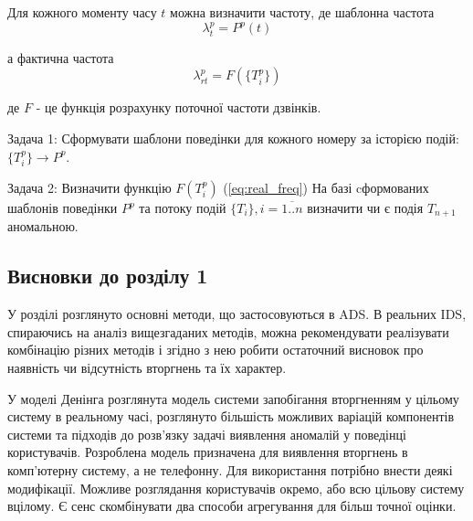   Для кожного моменту часу $t$ можна визначити частоту, де шаблонна частота 
\begin{equation}\label{eq:pattern_freq} \lambda_t^p = P^p(t) \end{equation}

  а фактична частота
 \begin{equation}\label{eq:real_freq} \lambda_{rt}^p = F(\{T_i^p\}) \end{equation}
 \begin{ESKDexplanation}
    \item де $F$ - це функція розрахунку поточної частоти дзвінків.
  \end{ESKDexplanation}

  Задача 1: Сформувати шаблони поведінки для кожного номеру за історією подій: $\{T_i^{p}\} \rightarrow P^{p}$.

  Задача 2: Визначити функцію $F({T_i^p})$ (\ref{eq:real_freq}) На базі cформованих шаблонів поведінки $P^{p}$ та потоку подій $\{T_i\}, i = \overline{1..n}$ визначити чи є подія $T_{n+1}$ аномальною.


\subsection*{Висновки до розділу 1}

    У розділі розглянуто основні методи, що застосовуються в ADS. В реальних IDS,
    спираючись на аналіз вищезгаданих методів, можна рекомендувати реалізувати
    комбінацію різних методів і згідно з нею робити остаточний висновок про наявність
    чи відсутність вторгнень та їх характер.

    У моделі Денінга розглянута модель системи запобігання вторгненням у цільому
    систему в реальному часі, розглянуто більшість можливих варіацій компонентів
    системи та підходів до розв'язку задачі виявлення аномалій у поведінці
    користувачів. Розроблена модель призначена для виявлення вторгнень в
    комп'ютерну систему, а не телефонну. Для використання потрібно внести деякі
    модифікації. Можливе розглядання користувачів окремо, або всю цільову
    систему вцілому. Є сенс скомбінувати два способи агрегування для більш
    точної оцінки.
